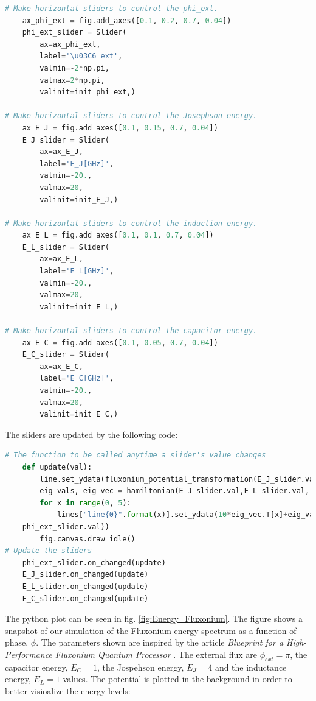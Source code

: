     \begin{lstlisting}[language = Python]
# Make horizontal sliders to control the phi_ext.
    ax_phi_ext = fig.add_axes([0.1, 0.2, 0.7, 0.04])
    phi_ext_slider = Slider(
        ax=ax_phi_ext,
        label='\u03C6_ext',
        valmin=-2*np.pi,
        valmax=2*np.pi,
        valinit=init_phi_ext,)

# Make horizontal sliders to control the Josephson energy.
    ax_E_J = fig.add_axes([0.1, 0.15, 0.7, 0.04])
    E_J_slider = Slider(
        ax=ax_E_J,
        label='E_J[GHz]',
        valmin=-20.,
        valmax=20,
        valinit=init_E_J,)

# Make horizontal sliders to control the induction energy.
    ax_E_L = fig.add_axes([0.1, 0.1, 0.7, 0.04])
    E_L_slider = Slider(
        ax=ax_E_L,
        label='E_L[GHz]',
        valmin=-20.,
        valmax=20,
        valinit=init_E_L,)

# Make horizontal sliders to control the capacitor energy.
    ax_E_C = fig.add_axes([0.1, 0.05, 0.7, 0.04])
    E_C_slider = Slider(
        ax=ax_E_C,
        label='E_C[GHz]',
        valmin=-20.,
        valmax=20,
        valinit=init_E_C,)
    \end{lstlisting}
    The sliders are updated by the following code: 
    \begin{lstlisting}[language = Python]
# The function to be called anytime a slider's value changes
    def update(val):
        line.set_ydata(fluxonium_potential_transformation(E_J_slider.val, E_L_slider.val,phi, phi_ext_slider.val))
        eig_vals, eig_vec = hamiltonian(E_J_slider.val,E_L_slider.val, E_C_slider.val,phi_ext_slider.val,N, phi)
        for x in range(0, 5):
            lines["line{0}".format(x)].set_ydata(10*eig_vec.T[x]+eig_vals[x])
    phi_ext_slider.val))
        fig.canvas.draw_idle()
# Update the sliders
    phi_ext_slider.on_changed(update)
    E_J_slider.on_changed(update)
    E_L_slider.on_changed(update)
    E_C_slider.on_changed(update)    
    \end{lstlisting}
    The python plot can be seen in fig. \ref{fig:Energy_Fluxonium}. The figure shows a snapshot of our simulation of the Fluxonium energy spectrum as a function of phase, $\phi$. The parameters shown are inspired by the article \textit{Blueprint for a High-Performance Fluxonium Quantum Processor} \cite{Nguyen2022}. The external flux are $\phi_{ext} = \pi$, the capacitor energy, $E_C= 1$, the Jospehson energy, $E_J = 4$ and the inductance energy, $E_L = 1$ values. The potential is plotted in the background in order to better visioalize the energy levels: 
